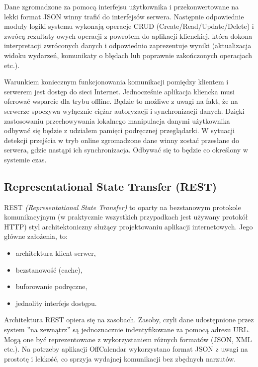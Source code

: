 Dane zgromadzone za pomocą interfejsu użytkownika i przekonwertowane na lekki format JSON winny trafić do interfejsów serwera. Następnie odpowiednie moduły logiki systemu wykonają operacje CRUD (Create/Read/Update/Delete) i zwrócą rezultaty owych operacji z powrotem do aplikacji klienckiej, która dokona interpretacji zwróconych danych i odpowiednio zaprezentuje wyniki (aktualizacja widoku wydarzeń, komunikaty o błędach lub poprawnie zakończonych operacjach etc.).

Warunkiem koniecznym funkcjonowania komunikacji pomiędzy klientem i serwerem jest dostęp do sieci Internet. Jednocześnie aplikacja kliencka musi oferować wsparcie dla trybu offline. Będzie to możliwe z uwagi na fakt, że na serwerze spoczywa wyłącznie ciężar autoryzacji i synchronizacji danych. Dzięki zastosowaniu przechowywania lokalnego manipulacja danymi użytkownika odbywać się będzie z udziałem pamięci podręcznej przeglądarki. W sytuacji detekcji przejścia w tryb online zgromadzone dane winny zostać przesłane do serwera, gdzie nastąpi ich synchronizacja. Odbywać się to będzie co określony w systemie czas.

\subsection{Representational State Transfer (REST)}
\label{sec:REST}

REST \emph{(Representational State Transfer)}\cite{restTut} to oparty na bezstanowym protokole komunikacyjnym (w praktycznie wszystkich przypadkach jest używany protokół HTTP) styl architektoniczny służący projektowaniu aplikacji internetowych. Jego główne założenia, to:

\begin{itemize}
\item architektura klient-serwer,
\item bezstanowość (cache),
\item buforowanie podręczne,
\item jednolity interfejs dostępu.
\end{itemize}

Architektura REST opiera się na zasobach. Zasoby, czyli dane udostępnione przez system ''na zewnątrz'' są jednoznacznie indentyfikowane za pomocą adresu URL. Mogą one być reprezentowane z wykorzystaniem różnych formatów (JSON, XML etc.). Na potrzeby aplikacji OffCalendar wykorzystano format JSON z uwagi na prostotę i lekkość, co sprzyja wydajnej komunikacji bez zbędnych narzutów.

